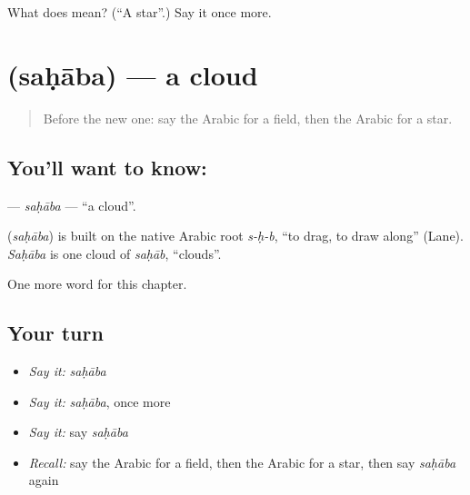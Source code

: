 \begin{tcolorbox}[breakable,colback=teal!4,colframe=teal!35!black,title={Before you move on}]
What does  mean? (\textquotedblleft{}A star\textquotedblright{}.) Say it once more.
\end{tcolorbox}
\section[\texorpdfstring{\ar{سحابة} (saḥāba)}{سحابة (saḥāba)}]{ (saḥāba) — a cloud}

\label{lesson:AR-C77-sahaba}



\begin{quote}
Before the new one: say the Arabic for a field, then the Arabic for a star.
\end{quote}

\subsection*{You'll want to know: }
\textbf{} — \emph{saḥāba} — \textquotedblleft{}a cloud\textquotedblright{}.

\begin{cousinweb}
\textbf{} (\emph{saḥāba}) is built on the native Arabic root \emph{s-ḥ-b}, \textquotedblleft{}to drag, to draw along\textquotedblright{} (Lane). \emph{Saḥāba} is one cloud of \emph{saḥāb}, \textquotedblleft{}clouds\textquotedblright{}.
\end{cousinweb}

\begin{grammarlens}[title={What you've built}]
One more word for this chapter.
\end{grammarlens}

\subsection*{Your turn}
\begin{itemize}
\raggedright
  \item \emph{Say it:} \emph{saḥāba}
  \item \emph{Say it:} \emph{saḥāba}, once more
  \item \emph{Say it:} say \emph{saḥāba}
  \item \emph{Recall:} say the Arabic for a field, then the Arabic for a star, then say \emph{saḥāba} again
\end{itemize}

